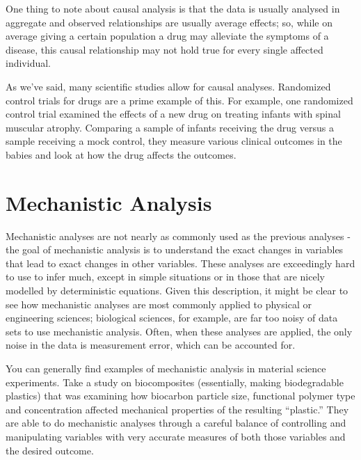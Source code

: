 \documentclass[10pt,a4paper,twoside]{article}\usepackage[]{graphicx}\usepackage[]{xcolor}
\begin{document}
One thing to note about causal analysis is that the data is usually analysed in aggregate and observed relationships are usually average effects; so, while on average giving a certain population a drug may alleviate the symptoms of a disease, this causal relationship may not hold true for every single affected individual.

As we’ve said, many scientific studies allow for causal analyses. Randomized control trials for drugs are a prime example of this. For example, one randomized control trial examined the effects of a new drug on treating infants with spinal muscular atrophy. Comparing a sample of infants receiving the drug versus a sample receiving a mock control, they measure various clinical outcomes in the babies and look at how the drug affects the outcomes.

\section{Mechanistic Analysis}

Mechanistic analyses are not nearly as commonly used as the previous analyses - the goal of mechanistic analysis is to understand the exact changes in variables that lead to exact changes in other variables. These analyses are exceedingly hard to use to infer much, except in simple situations or in those that are nicely modelled by deterministic equations. Given this description, it might be clear to see how mechanistic analyses are most commonly applied to physical or engineering sciences; biological sciences, for example, are far too noisy of data sets to use mechanistic analysis. Often, when these analyses are applied, the only noise in the data is measurement error, which can be accounted for.

You can generally find examples of mechanistic analysis in material science experiments. Take a study on biocomposites (essentially, making biodegradable plastics) that was examining how biocarbon particle size, functional polymer type and concentration affected mechanical properties of the resulting “plastic.” They are able to do mechanistic analyses through a careful balance of controlling and manipulating variables with very accurate measures of both those variables and the desired outcome.
\end{document}

